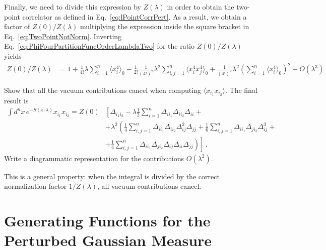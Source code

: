Finally, we need to divide this expression by $Z(\lambda)$ in order to
obtain the two-point correlator as defined in
Eq.~\ref{eq:lPointCorrPert}.  As a result, we obtain a factor of
$Z(0)/Z(\lambda)$ multiplying the expression inside the square bracket
in Eq.~\ref{eq:TwoPointNotNorm}. Inverting
Eq.~\ref{eq:PhiFourPartitionFuncOrderLambdaTwo} for the ratio
$Z(0)/Z(\lambda)$ yields
\begin{align}
 Z(0)/Z(\lambda) &= 
                    1 + \frac{1}{4!} \lambda \sum_{i=1}^n \langle x_i^4\rangle_0 
                    - \frac{1}{2!} \frac{1}{(4!)^2} \lambda^2 \sum_{i,j=1}^n 
                    \langle x_i^4 x_j^4\rangle_0 
                   + \frac{1}{(4!)^2} \lambda^2 \left(\sum_{i=1}^n \langle x_i^4\rangle_0\right)^2
                   + O(\lambda^3) 
\end{align}

\begin{Ex}
  Show that all the vacuum contributions cancel when computing $\langle
  x_{i_1} x_{i_2}\rangle$. The final result is
  \begin{align}
  \int d^nx\, e^{-S(x;\lambda)} 
  x_{i_1} x_{i_2} = Z(0) & 
                           \left[
                           \Delta_{i_1 i_2} - \lambda  \frac12 \sum_{i=1}^n
                           \Delta_{i i_1} \Delta_{i i_2} \Delta_{i i} 
                            + \right. \nonumber \\
                         & \left.
                           + \lambda^2 \left( 
                           \frac{1}{4} \sum_{i,j=1}^n \Delta_{i i_1}
                           \Delta_{i i_2} \Delta_{i j}^2 \Delta_{jj}
                           + \frac{1}{6} \sum_{i,j=1}^n \Delta_{i i_1}
                           \Delta_{j i_2} \Delta_{i j}^3 +
                           \right. \right. \nonumber \\
  \label{eq:TwoPointNorm}
                         & + \left. \left.
                           \frac{1}{4} \sum_{i,j=1}^n \Delta_{i i_1}
                           \Delta_{j i_2} \Delta_{i j} \Delta_{ii}\Delta_{jj}
                           \right)
                           \right]\, .
\end{align}
Write a diagrammatic representation for the contributions $O(\lambda^2)$.
\end{Ex}
This is a general property: when the integral is divided by the
correct normalization factor $1/Z(\lambda)$, all vacuum contributions
cancel.

\section{Generating Functions for the Perturbed Gaussian Measure}
\label{sec:gener-funct-pert}

